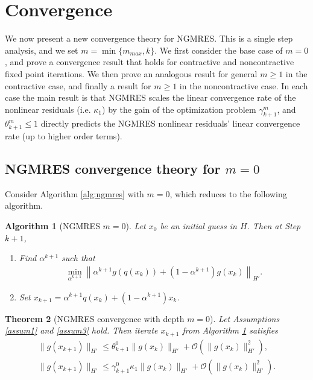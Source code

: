 \documentclass{article}
\numberwithin{equation}{section}
\newtheorem{thm}{Theorem}[section]
\newtheorem{alg}[thm]{Algorithm}
\begin{document}
\section{Convergence}

We now present a new convergence theory for NGMRES.  This is a single step analysis, and we set $m=\min \{m_{max},k \}$.  We first consider the base case of $m=0$, and prove a convergence result that holds for contractive and noncontractive fixed point iterations.  We then prove an analogous result for general $m\ge 1$ in the contractive case, and finally a result for $m\ge 1$ in the noncontractive case.  In each case the main result is that NGMRES scales the linear convergence rate of the nonlinear residuals (i.e. $\kappa_1$) by the gain of the optimization problem $\gamma^m_{k+1}$, and $\theta^m_{k+1} \le 1$ directly predicts the NGMRES nonlinear residuals' linear convergence rate (up to higher order terms). 

\subsection{NGMRES convergence theory for $m=0$}

Consider Algorithm \ref{alg:ngmres} with $m=0$, which reduces to the following algorithm.
\begin{alg}[NGMRES $m=0$]
\label{alg:ngmres0}
Let $x_0$ be an initial guess in $H$.  Then at Step $k+1$,
\begin{enumerate}
    \item[1.] Find $\alpha^{k+1}$ such that 
    \begin{align}
        \min\limits_{\alpha^{k+1}} \left\| \alpha^{k+1} g(q(x_k)) + (1-\alpha^{k+1}) g(x_k)\right\|_{H'}.
    \end{align}
    \item[2.] Set $x_{k+1} = \alpha^{k+1} q(x_k) + (1-\alpha^{k+1})x_k$.
\end{enumerate}
\end{alg}


\begin{thm}[NGMRES convergence with depth $m=0$]
\label{thm:ngmres0}
    Let Assumptions \ref{assum1} and \ref{assum3} hold. Then iterate $x_{k+1}$ from Algorithm \ref{alg:ngmres0} satisfies
     \begin{align}
     \label{eq:gx10}
        \| g(x_{k+1})\|_{H'} \le \theta^0_{k+1} \|g(x_k)\|_{H'} + \mathcal{O}(\|g(x_k)\|_{H'}^2), \\
         \| g(x_{k+1})\|_{H'} \le \gamma^0_{k+1} \kappa_1 \|g(x_k)\|_{H'} + \mathcal{O}(\|g(x_k)\|_{H'}^2).
         \label{eq:gx20}
    \end{align}
\end{thm}
\end{document}
